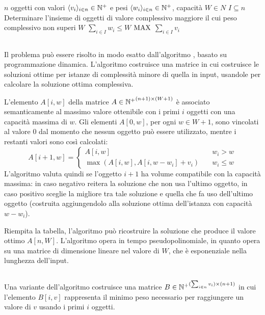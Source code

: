 \section{\Knapsack}
\popt{\Knapsack}
{$n$ oggetti con valori $\langle v_i \rangle_{i\in n}\in\mathbb N^+$ e pesi $\langle w_i \rangle_{i\in n}\in\mathbb N^+$, capacità $W\in N$}
{$I\subseteq n$}
{Determinare l'insieme di oggetti di valore complessivo maggiore il cui peso complessivo non superi $W$}
{$\sum_{i\in I}w_i\leq W$}
{$\mathrm{MAX}$}
{$\sum_{i\in I} v_i$}


\subsection{\DynamicKnapsack}
Il problema può essere risolto in modo esatto dall'algoritmo \DynamicKnapsack, basato su programmazione dinamica.
L'algoritmo costruisce una matrice in cui costruisce le soluzioni ottime per istanze di complessità minore di quella in input, usandole per calcolare la soluzione ottima complessiva.

L'elemento $A[i,w]$ della matrice $A\in{\mathbb N^+}^{(n+1)\times (W+1)}$ è associato semanticamente al massimo valore ottenibile con i primi $i$ oggetti con una capacità massima di $w$.
Gli elementi $A[0,w]$, per ogni $w\in W+1$, sono vincolati al valore $0$ dal momento che nessun oggetto può essere utilizzato, mentre i restanti valori sono così calcolati:
\begin{equation*}
	A[i+1,w] =
	\begin{cases}
		A[i,w]                       & \quad w_i>w     \\
		\max(A[i,w], A[i,w-w_i]+v_i) & \quad w_i\leq w
	\end{cases}
\end{equation*}
L'algoritmo valuta quindi se l'oggetto $i+1$ ha volume compatibile con la capacità massima: in caso negativo reitera la soluzione che non usa l'ultimo oggetto, in caso positivo sceglie la migliore tra tale soluzione e quella che fa uso dell'ultimo oggetto (costruita aggiungendolo alla soluzione ottima dell'istanza con capacità $w-w_i$).

Riempita la tabella, l'algoritmo può ricostruire la soluzione che produce il valore ottimo $A[n,W]$.
L'algoritmo opera in tempo pseudopolinomiale, in quanto opera su una matrice di dimensione lineare nel valore di $W$, che è esponenziale nella lunghezza dell'input.


\subsection{\WeightDynamicKnapsack}
Una variante dell'algoritmo \DynamicKnapsack costruisce una matrice $B\in{\mathbb N^+}^{(\sum_{i\in n} v_i)\times (n+1)}$ in cui l'elemento $B[i,v]$ rappresenta il minimo peso necessario per raggiungere un valore di $v$ usando i primi $i$ oggetti.

